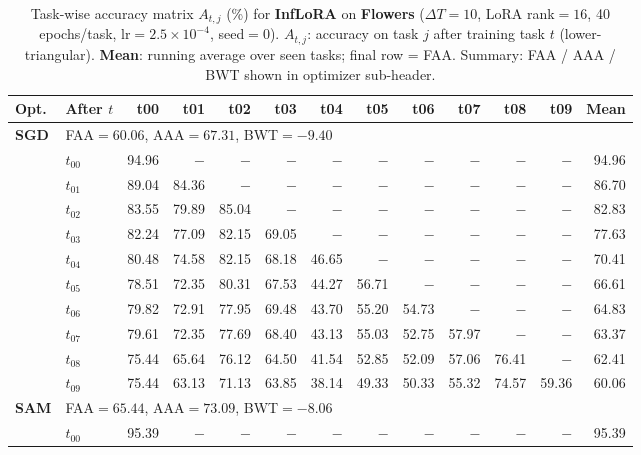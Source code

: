 \begin{table}[ht]
\centering
\caption{%
  Task-wise accuracy matrix $A_{t,j}$ (\%) for \textbf{InfLoRA} on \textbf{Flowers}
  ($\Delta T=10$, LoRA rank$=16$, 40 epochs/task, lr$=2.5\times10^{-4}$, seed$=0$).
  $A_{t,j}$: accuracy on task $j$ after training task $t$ (lower-triangular).
  \textbf{Mean}: running average over seen tasks; final row = FAA.
  Summary: FAA / AAA / BWT shown in optimizer sub-header.
}
\label{tab:raw_inflora_flowers}
\setlength{\tabcolsep}{2.8pt}
\renewcommand{\arraystretch}{0.88}
\scriptsize
\begin{tabular}{@{}l l r r r r r r r r r r r@{}}
\toprule
\textbf{Opt.} & \textbf{After $t$} & \textbf{t00} & \textbf{t01} & \textbf{t02} & \textbf{t03} & \textbf{t04} & \textbf{t05} & \textbf{t06} & \textbf{t07} & \textbf{t08} & \textbf{t09} & \textbf{Mean} \\
\midrule
\multirow{11}{*}{\textbf{SGD}} & \multicolumn{12}{l}{\quad\small FAA$=60.06$,\; AAA$=67.31$,\; BWT$=-9.40$} \\
 & $t_{00}$ & 94.96 & $-$ & $-$ & $-$ & $-$ & $-$ & $-$ & $-$ & $-$ & $-$ & 94.96 \\
 & $t_{01}$ & 89.04 & 84.36 & $-$ & $-$ & $-$ & $-$ & $-$ & $-$ & $-$ & $-$ & 86.70 \\
 & $t_{02}$ & 83.55 & 79.89 & 85.04 & $-$ & $-$ & $-$ & $-$ & $-$ & $-$ & $-$ & 82.83 \\
 & $t_{03}$ & 82.24 & 77.09 & 82.15 & 69.05 & $-$ & $-$ & $-$ & $-$ & $-$ & $-$ & 77.63 \\
 & $t_{04}$ & 80.48 & 74.58 & 82.15 & 68.18 & 46.65 & $-$ & $-$ & $-$ & $-$ & $-$ & 70.41 \\
 & $t_{05}$ & 78.51 & 72.35 & 80.31 & 67.53 & 44.27 & 56.71 & $-$ & $-$ & $-$ & $-$ & 66.61 \\
 & $t_{06}$ & 79.82 & 72.91 & 77.95 & 69.48 & 43.70 & 55.20 & 54.73 & $-$ & $-$ & $-$ & 64.83 \\
 & $t_{07}$ & 79.61 & 72.35 & 77.69 & 68.40 & 43.13 & 55.03 & 52.75 & 57.97 & $-$ & $-$ & 63.37 \\
 & $t_{08}$ & 75.44 & 65.64 & 76.12 & 64.50 & 41.54 & 52.85 & 52.09 & 57.06 & 76.41 & $-$ & 62.41 \\
 & $t_{09}$ & 75.44 & 63.13 & 71.13 & 63.85 & 38.14 & 49.33 & 50.33 & 55.32 & 74.57 & 59.36 & 60.06 \\
\midrule
\multirow{11}{*}{\textbf{SAM}} & \multicolumn{12}{l}{\quad\small FAA$=65.44$,\; AAA$=73.09$,\; BWT$=-8.06$} \\
 & $t_{00}$ & 95.39 & $-$ & $-$ & $-$ & $-$ & $-$ & $-$ & $-$ & $-$ & $-$ & 95.39 \\

\end{tabular}
\end{table}
